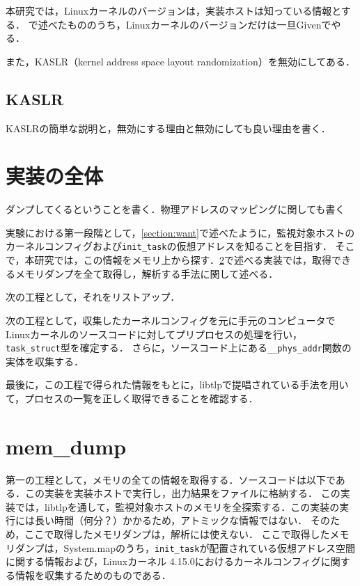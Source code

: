 本研究では，Linuxカーネルのバージョンは，実装ホストは知っている情報とする．
\label{section:want}で述べたもののうち，Linuxカーネルのバージョンだけは一旦Givenでやる．

また，KASLR（kernel address space layout randomization）を無効にしてある．

\subsection{KASLR}

KASLRの簡単な説明と，無効にする理由と無効にしても良い理由を書く．

\section{実装の全体}

ダンプしてくるということを書く．物理アドレスのマッピングに関しても書く

実験における第一段階として，\ref{section:want}で述べたように，監視対象ホストのカーネルコンフィグおよび\verb|init_task|の仮想アドレスを知ることを目指す．
そこで，本研究では，この情報をメモリ上から探す．\ref{section:mem_dump}で述べる実装では，取得できるメモリダンプを全て取得し，解析する手法に関して述べる．

次の工程として，それをリストアップ．

次の工程として，収集したカーネルコンフィグを元に手元のコンピュータでLinuxカーネルのソースコードに対してプリプロセスの処理を行い，\verb|task_struct|型を確定する．
さらに，ソースコード上にある\verb|__phys_addr|関数の実体を収集する．

最後に，この工程で得られた情報をもとに，libtlpで提唱されている手法を用いて，プロセスの一覧を正しく取得できることを確認する．

\section{mem\_dump}
\label{section:mem_dump}

第一の工程として，メモリの全ての情報を取得する．ソースコードは以下である．この実装を実装ホストで実行し，出力結果をファイルに格納する．
この実装では，libtlpを通して，監視対象ホストのメモリを全探索する．この実装の実行には長い時間（何分？）かかるため，アトミックな情報ではない．
そのため，ここで取得したメモリダンプは，解析には使えない．
ここで取得したメモリダンプは，System.mapのうち，\verb|init_task|が配置されている仮想アドレス空間に関する情報および，Linuxカーネル 4.15.0におけるカーネルコンフィグに関する情報を収集するためのものである．

